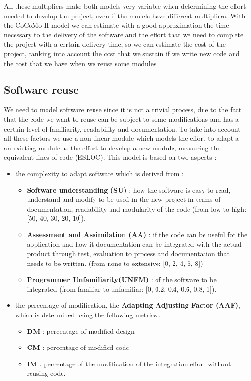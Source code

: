 All these multipliers make both models very variable when determining the effort needed to develop the project, even if the models have different multipliers. With the CoCoMo II model we can estimate with a good approximation the time necessary to the delivery of the software and the effort that we need to complete the project with a certain delivery time, so we can estimate the cost of the project, tanking into account the cost that we sustain if we write new code and the cost that we have when we reuse some modules.
\subsection{Software reuse}
We need to model software reuse since it is not a trivial process, due to the fact that the code we want to reuse can be subject to some modifications and has a certain level of familiarity, readability and documentation. To take into account all these factors we use a non linear module which models the effort to adapt a an existing module as the effort to develop a new module, measuring the equivalent lines of code (ESLOC). This model is based on two aspects :
\begin{itemize}
    \item the complexity to adapt software which is derived from :
          \begin{itemize}
              \item \textbf{Software understanding (SU)} : how the software is easy to read, understand and modify to be used in the new project in terms of documentation, readability and modularity of the code (from low to high: [50, 40, 30, 20, 10]).
              \item \textbf{Assessment and Assimilation (AA)} : if the code can be useful for the application and how it documentation can be integrated with the actual product through test, evaluation to process and documentation that needs to be written. (from none to extensive: [0, 2, 4, 6, 8]).
              \item \textbf{Programmer Unfamiliarity(UNFM)} : of the software to be integrated (from familiar to unfamiliar: [0, 0.2, 0.4, 0.6, 0.8, 1]).
          \end{itemize}
    \item the percentage of modification, the \textbf{Adapting Adjusting Factor (AAF)}, which is determined using the following metrics :
          \begin{itemize}
              \item \textbf{DM} : percentage of modified design
              \item \textbf{CM} : percentage of modified code
              \item \textbf{IM} : percentage of the modification of the integration effort without reusing code.
          \end{itemize}
\end{itemize}
